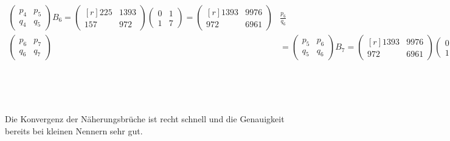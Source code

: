\begin{loesung}
\begin{align*}
\begin{pmatrix}
p_4&p_5\\
q_4&q_5
\end{pmatrix}
B_6
=
\begin{pmatrix*}[r]
225&1393\\
157& 972
\end{pmatrix*}
\begin{pmatrix}
0&1\\
1&7
\end{pmatrix}
=
\begin{pmatrix*}[r]
1393&9976\\
 972&6961
\end{pmatrix*}
&
\frac{p_6}{q_6}
&=
1.\underline{43312742}4220657975
\\
\begin{pmatrix}
p_6&p_7\\
q_6&q_7
\end{pmatrix}
&=
\begin{pmatrix}
p_5&p_6\\
q_5&q_6
\end{pmatrix}
B_7
=
\begin{pmatrix*}[r]
1393&9976\\
 972&6961
\end{pmatrix*}
\begin{pmatrix}
0&1\\
1&8
\end{pmatrix}
=
\begin{pmatrix}
9976&81201\\
6961&56660
\end{pmatrix}
&
\frac{p_7}{q_7}
&=
1.\underline{4331274267}56088951
\\
&&
\frac{p_8}{q_8}
&=
1.\underline{43312742672}1944930
\\
&&
\frac{p_9}{q_9}
&=
1.\underline{43312742672231}5079
\\
&&
\frac{p_{10}}{q_{10}}
&=
1.\underline{43312742672231}1748
\end{align*}
Die Konvergenz der Näherungsbrüche ist recht schnell und die Genauigkeit
bereits bei kleinen Nennern sehr gut.
\end{loesung}

